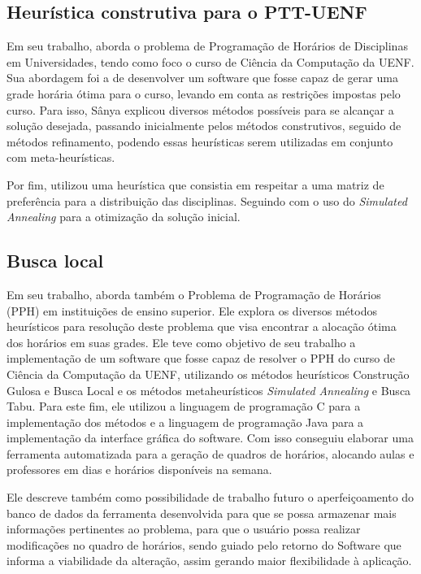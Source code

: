 \subsection{Heurística construtiva para o PTT-UENF} \label{ssec:sanya}     %

Em seu trabalho,  aborda o problema de Programação de Horários de Disciplinas em Universidades, tendo como foco o curso de Ciência da Computação da UENF. Sua abordagem foi a de desenvolver um software que fosse capaz de gerar uma grade horária ótima para o curso, levando em conta as restrições impostas pelo curso. Para isso, Sânya explicou diversos métodos possíveis para se alcançar a solução desejada, passando inicialmente pelos métodos construtivos, seguido de métodos refinamento, podendo essas heurísticas serem utilizadas em conjunto com meta-heurísticas.

Por fim, utilizou uma heurística que consistia em respeitar a uma matriz de preferência para a distribuição das disciplinas. Seguindo com o uso do \textit{Simulated Annealing} para a otimização da solução inicial.

\subsection{Busca local} \label{ssec:ricardo}   %

Em seu trabalho,  aborda também o Problema de Programação de Horários (PPH) em instituições de ensino superior. Ele explora os diversos métodos heurísticos para resolução deste problema que visa encontrar a alocação ótima dos horários em suas grades. Ele teve como objetivo de seu trabalho a implementação de um software que fosse capaz de resolver o PPH do curso de Ciência da Computação da UENF, utilizando os métodos heurísticos Construção Gulosa e Busca Local e os métodos metaheurísticos \textit{Simulated Annealing} e Busca Tabu. Para este fim, ele utilizou a linguagem de programação C para a implementação dos métodos e a linguagem de programação Java para a implementação da interface gráfica do software. Com isso conseguiu elaborar uma ferramenta automatizada para a geração de quadros de horários, alocando aulas e professores em dias e horários disponíveis na semana.

Ele descreve também como possibilidade de trabalho futuro o aperfeiçoamento do banco de dados da ferramenta desenvolvida para que se possa armazenar mais informações pertinentes ao problema, para que o usuário possa realizar modificações no quadro de horários, sendo guiado pelo retorno do Software que informa a viabilidade da alteração, assim gerando maior flexibilidade à aplicação.

